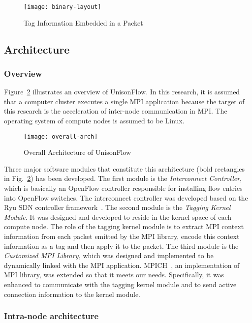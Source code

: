 \begin{figure}
    \centering
    \texttt{[image: binary-layout]}
    \caption{Tag Information Embedded in a Packet}%
    \label{fig:binary-layout}
\end{figure}

\subsection{Architecture}

\subsubsection{Overview}

Figure~\ref{fig:overall-arch} illustrates an overview of UnisonFlow. In
this research, it is assumed that a computer cluster executes a
single MPI application because the target of this research is the acceleration
of inter-node communication in MPI\@. The operating system of compute
nodes is assumed to be Linux.

\begin{figure}
    \centering
    \texttt{[image: overall-arch]}
    \caption{Overall Architecture of UnisonFlow}%
    \label{fig:overall-arch}
\end{figure}

Three major software modules that constitute this architecture (bold
rectangles in Fig.~\ref{fig:overall-arch}) has been developed. The first
module is the \emph{Interconnect Controller}, which is basically an
OpenFlow controller responsible for installing flow entries into
OpenFlow switches. The interconnect controller was developed based on
the Ryu SDN controller framework~\autocite{Ryu2014}. The second module
is the \emph{Tagging Kernel Module}. It was designed and developed to reside
in the kernel space of each compute node. The role of the tagging kernel
module is to extract MPI context information from each packet emitted by the
MPI library, encode this context information as a tag and then apply it to the
packet. The third module is the \emph{Customized MPI Library,} which
was designed and implemented to be dynamically linked with the MPI
application. MPICH~\autocite{Gropp2002}, an implementation of MPI library, was
extended so that it meets our needs. Specifically, it was enhanced to
communicate with the tagging kernel module and to send active connection
information to the kernel module.

\subsubsection{Intra-node architecture}

